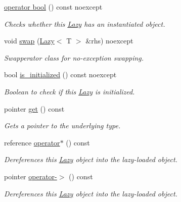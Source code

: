 \begin{DoxyCompactItemize}
\hyperlink{classlazy_1_1_lazy_a59db9d75cbb67f23df5ad873103aacc8}{operator bool} () const  noexcept
\begin{DoxyCompactList}\small\item\em Checks whether this {\ttfamily \hyperlink{classlazy_1_1_lazy}{Lazy}} has an instantiated object. \end{DoxyCompactList}\item 
void \hyperlink{classlazy_1_1_lazy_a72542081e516ef41c947d6304bf64263}{swap} (\hyperlink{classlazy_1_1_lazy}{Lazy}$<$ T $>$ \&rhs) noexcept
\begin{DoxyCompactList}\small\item\em Swapperator class for no-\/exception swapping. \end{DoxyCompactList}\item 
bool \hyperlink{classlazy_1_1_lazy_adff0b1ae7ee5d748e38f05a44dcc953e}{is\+\_\+initialized} () const  noexcept
\begin{DoxyCompactList}\small\item\em Boolean to check if this {\ttfamily \hyperlink{classlazy_1_1_lazy}{Lazy}} is initialized. \end{DoxyCompactList}\item 
pointer \hyperlink{classlazy_1_1_lazy_a4c53f464eb67e57659ab3b3fb1ed3f8d}{get} () const 
\begin{DoxyCompactList}\small\item\em Gets a pointer to the underlying type. \end{DoxyCompactList}\item 
reference \hyperlink{classlazy_1_1_lazy_a6404c4462b3bdf4cb71822c8404028ef}{operator$\ast$} () const 
\begin{DoxyCompactList}\small\item\em Dereferences this {\ttfamily \hyperlink{classlazy_1_1_lazy}{Lazy}} object into the lazy-\/loaded object. \end{DoxyCompactList}\item 
pointer \hyperlink{classlazy_1_1_lazy_a2fc1a87801ea11c3bd132c8fa95f52eb}{operator-\/$>$} () const 
\begin{DoxyCompactList}\small\item\em Dereferences this {\ttfamily \hyperlink{classlazy_1_1_lazy}{Lazy}} object into the lazy-\/loaded object. \end{DoxyCompactList}\end{DoxyCompactItemize}
